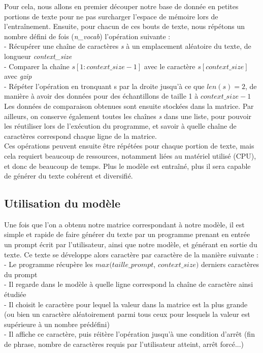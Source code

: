 \documentclass[12pt]{article}
\begin{document}
Pour cela, nous allons en premier découper notre base de donnée en petites portions de texte pour ne pas surcharger l'espace de mémoire lors de l'entraînement. Ensuite, pour chacun de ces bouts de texte, nous répétons un nombre défini de fois (\textit{n\_vocab}) l'opération suivante :\\
- Récupérer une chaîne de caractères \textit{s} à un emplacement aléatoire du texte, de longueur \textit{context\_size}\\
- Comparer la chaîne $s[1:context\_ size-1]$ avec le caractère $s[context\_ size]$ avec \textit{gzip}\\
- Répéter l'opération en tronquant s par la droite jusqu'à ce que $len(s) = 2$, de manière à avoir des données pour des échantillons de taille 1 à $context\_ size-1$\\

Les données de comparaison obtenues sont ensuite stockées dans la matrice. Par ailleurs, on conserve également toutes les chaînes \textit{s} dans une liste, pour pouvoir les réutiliser lors de l'exécution du programme, et savoir à quelle chaîne de caractères correspond chaque ligne de la matrice.\\

Ces opérations peuvent ensuite être répétées pour chaque portion de texte, mais cela requiert beaucoup de ressources, notamment liées au matériel utilisé (CPU), et donc de beaucoup de temps. Plus le modèle est entraîné, plus il sera capable de générer du texte cohérent et diversifié.\\

\subsection{Utilisation du modèle}

Une fois que l'on a obtenu notre matrice correspondant à notre modèle, il est simple et rapide de faire générer du texte par un programme prenant en entrée un prompt écrit par l'utilisateur, ainsi que notre modèle, et générant en sortie du texte. Ce texte se développe alors caractère par caractère de la manière suivante :\\
- Le programme récupère les $max(taille\_prompt$, $context\_size)$ derniers caractères du prompt\\
- Il regarde dans le modèle à quelle ligne correspond la chaîne de caractère ainsi étudiée\\
- Il choisit le caractère pour lequel la valeur dans la matrice est la plus grande (ou bien un caractère aléatoirement parmi tous ceux pour lesquels la valeur est supérieure à un nombre prédéfini)\\
- Il affiche ce caractère, puis réitère l'opération jusqu'à une condition d'arrêt (fin de phrase, nombre de caractères requis par l'utilisateur atteint, arrêt forcé...)\\
\end{document}
